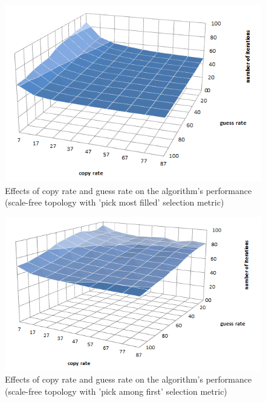 \documentclass[letterpaper]{article}
\begin{document}
\begin{figure}
\centering
\includegraphics[scale=0.60]{copy_guess_free_most}
\caption{Effects of copy rate and guess rate on the algorithm's performance (scale-free topology with 'pick most filled' selection metric)
}
\label{fig:copy_guess_free_most}
\end{figure}

\begin{figure}
\centering
\includegraphics[scale=0.60]{copy_guess_free_prob}
\caption{Effects of copy rate and guess rate on the algorithm's performance (scale-free topology with 'pick among first' selection metric)
}
\label{fig:copy_guess_free_most}
\end{figure}
\end{document}
